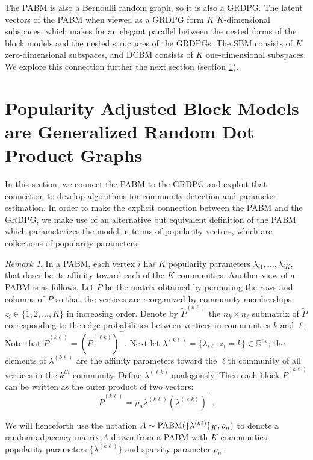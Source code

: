 \documentclass[
  12pt,
]{article}
\theoremstyle{definition}
\theoremstyle{definition}
\theoremstyle{definition}
\theoremstyle{definition}
\theoremstyle{remark}
\newtheorem*{remark}{Remark}
\begin{document}
The PABM is also a Bernoulli random graph, so it is also a GRDPG.
The latent vectors of the PABM when viewed as a GRDPG form \(K\) \(K\)-dimensional subspaces, which makes for an elegant parallel between the nested forms of the block models and the nested structures of the GRDPGs: The SBM consists of \(K\) zero-dimensional subspaces, and DCBM consists of \(K\) one-dimensional subspaces.
We explore this connection further the next section (section \ref{sec:pabm-grdpg}).

\newpage

\hypertarget{sec:pabm-grdpg}{%
\section{Popularity Adjusted Block Models are Generalized Random Dot Product Graphs}\label{sec:pabm-grdpg}}

In this section, we connect the PABM to the GRDPG and exploit that connection to develop algorithms for community detection and parameter estimation.
In order to make the explicit connection between the PABM and the GRDPG, we make use of an alternative but equivalent definition of the PABM which parameterizes the model in terms of popularity vectors, which are collections of popularity parameters.

\begin{remark}
\label{rem:pabm_view2}
In a PABM, each vertex $i$ has $K$ popularity parameters $\lambda_{i1}, \dots, \lambda_{iK}$, that describe its affinity toward each of the $K$ communities. 
Another view of a PABM is as follows.
Let $\tilde{P}$ be the matrix obtained by permuting the rows and columns of $P$ so that the vertices are reorganized by community memberships $z_i \in \{1,2,\dots,K\}$ in increasing order. 
Denote by $\tilde{P}^{(k \ell)}$ the $n_k \times n_{\ell}$ submatrix of $\tilde{P}$ corresponding to the edge probabilities between vertices in communities $k$ and $\ell$. 
Note that $\tilde{P}^{(k \ell)} = (\tilde{P}^{(\ell k)})^\top$. 
Next let $\lambda^{(k \ell)} = \{\lambda_{i \ell} \colon z_i = k\} \in \mathbb{R}^{n_k}$; the elements of $\lambda^{(k \ell)}$ are the affinity parameters toward the $\ell$th community of all vertices in the $k^{th}$ community. 
Define $\lambda^{(\ell k)}$ analogously. 
Then each block $\tilde{P}^{(k \ell)}$ can be written as the outer product of two vectors:
\begin{equation} \label{eq:pabm}
\tilde{P}^{(k \ell)} = \rho_n \lambda^{(k \ell)} (\lambda^{(\ell k)})^{\top}.
\end{equation} 

We will henceforth use the notation \(A \sim \mathrm{PABM}(\{\lambda^{(k \ell)}\}_K, \rho_n)\) to denote a random adjacency matrix \(A\) drawn from a PABM with $K$ communities, popularity parameters \(\{\lambda^{(k \ell)}\}\) and sparsity parameter $\rho_n$.
\end{remark}
\end{document}
